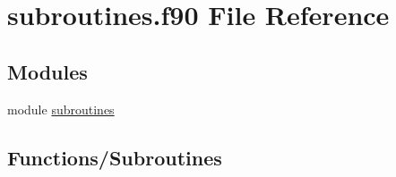 \hypertarget{subroutines_8f90}{
\section{subroutines.f90 File Reference}
\label{subroutines_8f90}
}
\subsection*{Modules}
\begin{DoxyCompactItemize}
\item 
module \hyperlink{namespacesubroutines}{subroutines}
\end{DoxyCompactItemize}
\subsection*{Functions/Subroutines}
